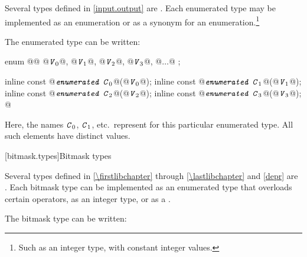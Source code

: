 \pnum
Several types defined in \ref{input.output} are
.
Each enumerated type may be implemented as an enumeration or as a synonym for
an enumeration.\footnote{Such as an integer type, with constant integer
values.}

\pnum
The enumerated type  can be written:

\begin{codeblock}
enum @@ { @$\texttt{\textit{V}}_{0}$@, @$\texttt{\textit{V}}_{1}$@, @$\texttt{\textit{V}}_{2}$@, @$\texttt{\textit{V}}_{3}$@, @$\ldots$@ };

inline const @$\texttt{\textit{enumerated C}}_{0}$@(@$\texttt{\textit{V}}_{0}$@);
inline const @$\texttt{\textit{enumerated C}}_{1}$@(@$\texttt{\textit{V}}_{1}$@);
inline const @$\texttt{\textit{enumerated C}}_{2}$@(@$\texttt{\textit{V}}_{2}$@);
inline const @$\texttt{\textit{enumerated C}}_{3}$@(@$\texttt{\textit{V}}_{3}$@);
  @\vdots@
\end{codeblock}

\pnum
Here, the names $\texttt{\textit{C}}_0$,
$\texttt{\textit{C}}_1$, etc.\ represent
for this particular enumerated type.
%
All such elements have distinct values.

[bitmask.types]{Bitmask types}

\pnum
Several types defined in \ref{\firstlibchapter} through \ref{\lastlibchapter}
and \ref{depr} are
.
Each bitmask type can be implemented as an
enumerated type that overloads certain operators, as an integer type,
or as a
.
%

\pnum
The bitmask type  can be written:

